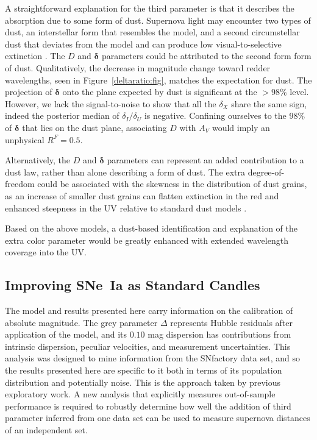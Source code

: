 \documentclass{aastex61}   	%
\begin{document}
A straightforward explanation for the third parameter is that it describes the absorption due to some form of dust. 
Supernova light may encounter two types
of dust, an interstellar form  that resembles the  model, and a second
circumstellar dust that deviates from the model and can produce low visual-to-selective extinction
\citep{2008ApJ...686L.103G}.
The $D$ and $\pmb{\delta}$ parameters could be attributed to the second form form of dust.
Qualitatively,  the decrease in magnitude change toward redder wavelengths, seen in Figure~\ref{deltaratio:fig}, matches the 
expectation for dust.  The projection of  $\pmb{\delta}$ onto the plane expected by dust is significant at the $>98$\% level.  However, we
lack the signal-to-noise to show that  all the  $\delta_X$ share the same sign, indeed the posterior median of $\delta_I/\delta_U$ is negative.
Confining ourselves to the 98\% of   $\pmb{\delta}$ that lies on the dust plane, associating 
$D$ with $A_V$ would imply an unphysical $R^F=0.5$.

Alternatively, the $D$ and $\pmb{\delta}$ parameters can represent an added contribution to a dust law, rather than alone
describing a form of dust.  The extra degree-of-freedom could be associated with the skewness in the distribution of dust grains, as an increase of smaller dust grains
can flatten extinction in the red and enhanced steepness in the UV relative to standard dust models  \citep[Figure~3 in][]{2015ApJ...807L..26G,
2017ApJ...836...13H}.

Based on the above models, a dust-based identification and explanation of the extra color parameter would be greatly enhanced with
extended wavelength coverage into the UV.

\subsection{Improving SNe~Ia as Standard Candles}
The model and results presented here
carry information on the calibration of absolute magnitude.  The grey parameter $\Delta$ represents Hubble residuals after
application of the model, and its  $0.10$ mag dispersion has contributions from intrinsic dispersion, peculiar velocities, and
measurement uncertainties.
This analysis was designed to mine information from the SNfactory data set, and so the results presented here
are specific to it both in terms of its population distribution and potentially noise.  This is the approach taken by previous
exploratory work.
A new analysis that explicitly measures out-of-sample performance is required to robustly determine how
well the addition of third parameter inferred from one data set can be used to measure supernova distances
of an independent set.
\end{document}
